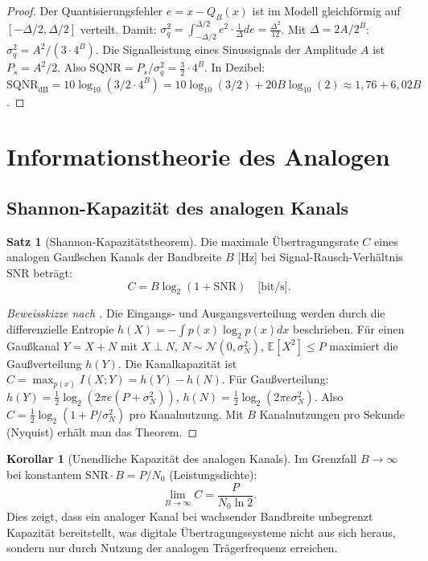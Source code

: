 ﻿\documentclass[a4paper,12pt]{article}
\theoremstyle{definition}
\newtheorem{satz}{Satz}
\newtheorem{korollar}{Korollar}
\begin{document}
\begin{proof}
Der Quantisierungsfehler $e = x - Q_B(x)$ ist im Modell gleichförmig auf
$[-\Delta/2, \Delta/2]$ verteilt.  Damit:
$\sigma_q^2 = \int_{-\Delta/2}^{\Delta/2} e^2 \cdot \frac{1}{\Delta} de = \frac{\Delta^2}{12}$.
Mit $\Delta = 2A/2^B$: $\sigma_q^2 = A^2/(3 \cdot 4^B)$.
Die Signalleistung eines Sinussignals der Amplitude $A$ ist $P_s = A^2/2$.
Also $\mathrm{SQNR} = P_s/\sigma_q^2 = \frac{3}{2} \cdot 4^B$.
In Dezibel: $\mathrm{SQNR}_{\mathrm{dB}} = 10\log_{10}(3/2 \cdot 4^B) = 10\log_{10}(3/2) + 20B\log_{10}(2) \approx 1{,}76 + 6{,}02 B$.
\end{proof}

\section{Informationstheorie des Analogen}
\label{sec:information}

\subsection{Shannon-Kapazität des analogen Kanals}

\begin{satz}[Shannon-Kapazitätstheorem]
\label{satz:shannon}
Die maximale Übertragungsrate $C$ eines analogen Gaußschen Kanals der Bandbreite
$B$ [Hz] bei Signal-Rausch-Verhältnis $\mathrm{SNR}$ beträgt:
\[
C = B \log_2(1 + \mathrm{SNR}) \quad \text{[bit/s]}.
\]
\end{satz}

\begin{proof}[Beweisskizze nach \citealt{Shannon1948}]
Die Eingangs- und Ausgangsverteilung werden durch die differenzielle Entropie
$h(X) = -\int p(x) \log_2 p(x) dx$ beschrieben.
Für einen Gaußkanal $Y = X + N$ mit $X \perp N$, $N \sim \mathcal{N}(0, \sigma_N^2)$,
$\mathbb{E}[X^2] \leq P$ maximiert die Gaußverteilung $h(Y)$.
Die Kanalkapazität ist $C = \max_{p(x)} I(X;Y) = h(Y) - h(N)$.
Für Gaußverteilung: $h(Y) = \frac{1}{2}\log_2(2\pi e (P + \sigma_N^2))$,
$h(N) = \frac{1}{2}\log_2(2\pi e \sigma_N^2)$.
Also $C = \frac{1}{2}\log_2(1 + P/\sigma_N^2)$ pro Kanalnutzung.
Mit $B$ Kanalnutzungen pro Sekunde (Nyquist) erhält man das Theorem.
\end{proof}

\begin{korollar}[Unendliche Kapazität des analogen Kanals]
Im Grenzfall $B \to \infty$ bei konstantem $\mathrm{SNR} \cdot B = P/N_0$ (Leistungsdichte):
\[
\lim_{B\to\infty} C = \frac{P}{N_0 \ln 2}.
\]
Dies zeigt, dass ein analoger Kanal bei wachsender Bandbreite unbegrenzt
Kapazität bereitstellt, was digitale Übertragungssysteme nicht aus sich heraus,
sondern nur durch Nutzung der analogen Trägerfrequenz erreichen.
\end{korollar}
\end{document}

